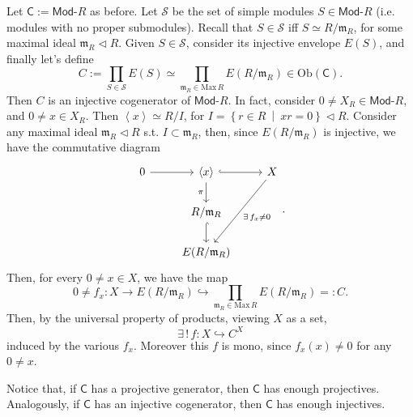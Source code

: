 \begin{ex}
	Let $\mathsf{C}:= \mathsf{Mod}\text{-}R$ as before.
	Let $\mathcal{S}$ be the set of simple modules $S \in \mathsf{Mod}\text{-}R$ (i.e. modules with no proper submodules).
	Recall that $S \in \mathcal{S}$ iff $S \simeq R/\mathfrak{m}_R$, for some maximal ideal $\mathfrak{m}_R \triangleleft R$.
	Given $S \in \mathcal{S}$, consider its injective envelope $E(S)$, and finally
	let's define
	\begin{equation}
		C := \prod_{S \in \mathcal{S}} E(S) \simeq
		\prod_{\mathfrak{m}_R \in \mathrm{Max}\, R} E \left( R / \mathfrak{m}_R \right)
		\in \mathrm{Ob} \left(\mathsf{C}\right)
	.\end{equation} 
	Then $C$ is an injective cogenerator of $\mathsf{Mod}\text{-}R$.
	In fact, consider $0 \neq X_R \in \mathsf{Mod}\text{-}R$, and $0 \neq x \in X_R$.
	Then $\left\langle x \right\rangle \simeq R/I$, 
	for $I = \left\{ r \in R \ \middle|\ xr = 0 \right\} \triangleleft R$.
	Consider any maximal ideal $\mathfrak{m}_R \triangleleft R$ s.t. $I \subset \mathfrak{m}_R$,
	then, since $E(R/\mathfrak{m}_R)$ is injective, we have the commutative diagram
	\begin{equation}
	\begin{tikzcd}
		0 \arrow[r, "", rightarrow] &
		\left\langle x \right\rangle \arrow[r, "", hookrightarrow] \arrow[d, "\pi"', rightarrow] &
		X \arrow[ldd, "\exists\, f_x \neq 0", rightarrow] \\
		& R/\mathfrak{m}_R \arrow[d, "", hookrightarrow] & \\
		& E(R/\mathfrak{m}_R) &
	\end{tikzcd}
	.\end{equation} 
	Then, for every $0 \neq x \in X$, we have the map
	\begin{equation}
		0 \neq f_x: X \to E \left( R/\mathfrak{m}_R \right) \hookrightarrow
		\prod_{\mathfrak{m}_R \in \mathrm{Max}\, R} E \left( R / \mathfrak{m}_R \right) =: C
	.\end{equation} 
	Then, by the universal property of products, viewing $X$ as a set,
	\begin{equation}
	\exists\, !\, f: X \hookrightarrow C^X
	\end{equation} 
	induced by the various $f_x$.
	Moreover this $f$ is mono, since $f_x(x) \neq 0$ for any $0 \neq x$.
\end{ex} 

\begin{rem}
	Notice that, if $\mathsf{C}$ has a projective generator, then $\mathsf{C}$
	has enough projectives.
	Analogously, if $\mathsf{C}$ has an injective cogenerator, then $\mathsf{C}$ 
	has enough injectives.
\end{rem} 

